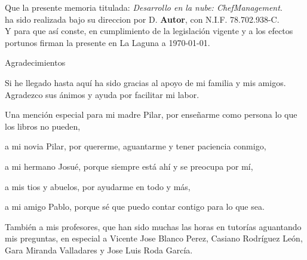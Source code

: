 \documentclass[spanish,a4paper,14pt,twoside]{report}
\begin{document}
\vspace*{0.1in}
Que la presente memoria titulada: \emph{Desarrollo en la nube: ChefManagement}. \\

\vspace*{0.1in}
ha sido realizada bajo su direccion por D. \textbf{Autor}, con N.I.F. 78.702.938-C. \\

\vspace*{0.1in}
Y para que así conste, en cumplimiento de la legislación vigente y a los efectos portunos firman la presente en La Laguna a \today.   

\newpage
{
\begin{flushright}
  \begin{LARGE}
    Agradecimientos
  \end{LARGE}
\end{flushright}

\hspace{3mm}

\begin{large}

Si he llegado hasta aquí ha sido gracias al apoyo de mi familia y mis amigos. Agradezco sus ánimos y ayuda por facilitar mi labor.

\vspace*{0.1in}
Una mención especial para mi madre Pilar, por enseñarme como persona lo que los libros no pueden,

\vspace*{0.1in}
a mi novia Pilar, por quererme, aguantarme y tener paciencia conmigo,

\vspace*{0.1in}
a mi hermano Josué, porque siempre está ahí y se preocupa por mí,

\vspace*{0.1in}
a mis tios y abuelos, por ayudarme en todo y más,

\vspace*{0.1in}
a mi amigo Pablo, porque sé que puedo contar contigo para lo que sea.

\vspace*{0.1in}
También a mis profesores, que han sido muchas las horas en tutorías aguantando mis preguntas, en especial a Vicente Jose Blanco Perez, Casiano Rodríguez León, Gara Miranda Valladares y Jose Luis Roda García.

\hspace{3mm}

\end{large}

}
\end{document}
